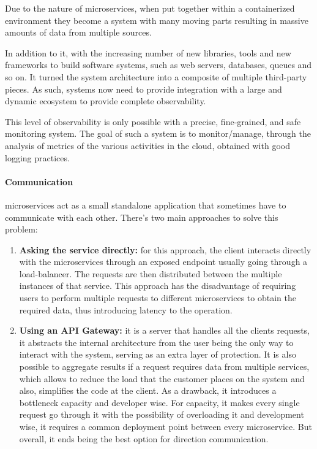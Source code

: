 Due to the nature of microservices, when put together within a containerized environment they become a system with many moving parts resulting in massive amounts of data from multiple sources.

In addition to it, with the increasing number of new libraries, tools and new frameworks to build software systems, such as web servers, databases, queues and so on. It turned the system architecture into a composite of multiple third-party pieces. As such, systems now need to provide integration with a large and dynamic ecosystem to provide complete observability.

This level of observability is only possible with a precise, fine-grained, and safe monitoring system. The goal of such a system is to monitor/manage, through the analysis of metrics of the various activities in the cloud, obtained with good logging practices.

\paragraph{\textbf{Communication}} microservices act as a small standalone application that sometimes have to communicate with each other. There's two main approaches to solve this problem:

\begin{enumerate}
    \item \textbf{Asking the service directly:} for this approach, the client interacts directly with the microservices through an exposed endpoint usually going through a \gls{load-balancer}. The requests are then distributed between the multiple instances of that service. This approach has the disadvantage of requiring users to perform multiple requests to different microservices to obtain the required data, thus introducing latency to the operation. 
    \item \textbf{Using an API Gateway:} it is a server that handles all the clients requests, it abstracts the internal architecture from the user being the only way to interact with the system, serving as an extra layer of protection. It is also possible to aggregate results if a request requires data from multiple services, which allows to reduce the load that the customer places on the system and also, simplifies the code at the client. As a drawback, it introduces a bottleneck capacity and developer wise. For capacity, it makes every single request go through it with the possibility of overloading it and development wise, it requires a common deployment point between every microservice. But overall, it ends being the best option for direction communication.
\end{enumerate}

